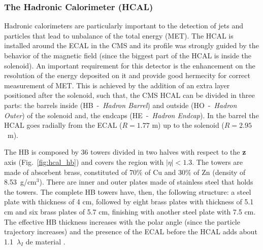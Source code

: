 \subsubsection{The Hadronic Calorimeter (HCAL)}
Hadronic calorimeters are particularly important to the detection of jets and particles that lead to unbalance of the total energy (MET). The HCAL is installed around the ECAL in the CMS and its profile was strongly guided by the behavior of the magnetic field (since the biggest part of the HCAL is inside the solenoid). An important requirement for this detector is the enhancement on the resolution of the energy deposited on it and provide good hermecity for correct measurement of MET. This is achieved by the addition of an extra layer positioned after the solenoid, such that, the CMS HCAL can be divided in three parts: the barrels inside (HB~-~\textit{Hadron Barrel}) and outside (HO~-~\textit{Hadron Outer}) of the solenoid and, the endcaps (HE~-~\textit{Hadron Endcap}). In the barrel the HCAL goes radially from the ECAL ($R = 1.77$ m) up to the solenoid ($R = 2.95$~m).

The HB is composed by 36 towers divided in two halves with respect to the \textbf{z} axis (Fig.~\ref{fig:hcal_hb}) and covers the region with $|\eta|<1.3$. The towers are made of absorbent brass, constituted of 70$\%$ of Cu and 30$\%$ of Zn (density of 8.53~g/cm$^{3}$). There are inner and outer plates made of stainless steel that holds the towers. The complete HB towers have, then, the following structure: a steel plate with thickness of 4 cm, followed by eight brass plates with thickness of 5.1 cm and six brass plates of 5.7 cm, finishing with another steel plate with 7.5 cm. The effective HB thickness increases with the polar angle (since the particle trajectory increases) and the presence of the ECAL before the HCAL adds about 1.1~$\lambda_I$ de material \cite{bib:JINST-3-362-2008,bib:CMS-PTDR-2006}.

